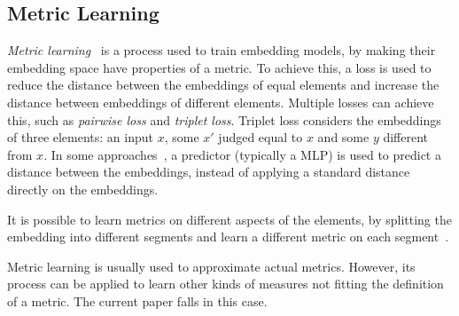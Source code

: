 \subsection{Metric Learning}
\textit{Metric learning}~\cite{vae-metric-learning:2018:xudong} is a process used to train embedding models, by making their embedding space have properties of a metric.
To achieve this, a loss is used to reduce the distance between the embeddings of equal elements and increase the distance between embeddings of different elements.
Multiple losses can achieve this, such as \textit{pairwise loss} and \textit{triplet loss}. 
Triplet loss considers the embeddings of three elements: an input $x$, some $x'$ judged equal to $x$ and some $y$ different from $x$.
In some approaches~\cite{deep-metric-multispeaker:2020:kulkarni}, a predictor (typically a MLP) is used to predict a distance between the embeddings, instead of applying a standard distance directly on the embeddings.

It is possible to learn metrics on different aspects of the elements, by splitting the embedding into different segments and learn a different metric on each segment~\cite{deep-metric-multispeaker:2020:kulkarni}.

Metric learning is usually used to approximate actual metrics.
However, its process can be applied to learn other kinds of measures not fitting the definition of a metric.
The current paper falls in this case.
